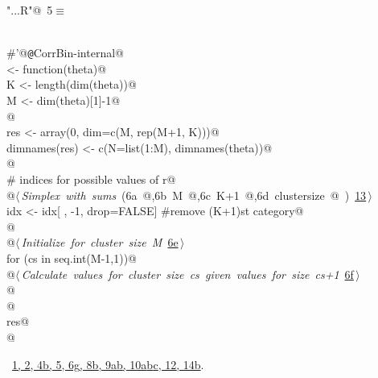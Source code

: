 \documentclass[reqno]{amsart}
\renewcommand{\NWtarget}[2]{\hypertarget{#1}{#2}}
\renewcommand{\NWlink}[2]{\hyperlink{#1}{#2}}
\begin{document}
\begin{flushleft} \small\label{scrap20}\raggedright\small
\NWtarget{nuweb5}{} \verb@"..\R\ExchMultinomial.R"@\nobreak\ {\footnotesize {5}}$\equiv$
\vspace{-1ex}
\begin{list}{}{} \item
\mbox{}\verb@@\\
\mbox{}\verb@#'@{\tt @}\verb@rdname CorrBin-internal@\\
\mbox{}\verb@Marginals <- function(theta){@\\
\mbox{}\verb@  K <- length(dim(theta))@\\
\mbox{}\verb@  M <- dim(theta)[1]-1@\\
\mbox{}\verb@  @\\
\mbox{}\verb@  res <- array(0, dim=c(M, rep(M+1, K)))@\\
\mbox{}\verb@  dimnames(res) <- c(N=list(1:M), dimnames(theta))@\\
\mbox{}\verb@  @\\
\mbox{}\verb@  # indices for possible values of r@\\
\mbox{}\verb@  @\hbox{$\langle\,${\itshape Simplex with sums}\nobreak\ ({\footnotesize 6a\label{scrap21}
 }\mbox{}\verb@idx @,{\footnotesize 6b\label{scrap22}
 }\mbox{}\verb@ M @,{\footnotesize 6c\label{scrap23}
 }\mbox{}\verb@ K+1 @,{\footnotesize 6d\label{scrap24}
 }\mbox{}\verb@ clustersize @ ) {\footnotesize \NWlink{nuweb13}{13}}$\,\rangle$}\verb@@\\
\mbox{}\verb@  idx <- idx[ , -1, drop=FALSE]  #remove (K+1)st category@\\
\mbox{}\verb@  @\\
\mbox{}\verb@  @\hbox{$\langle\,${\itshape Initialize for cluster size M}\nobreak\ {\footnotesize \NWlink{nuweb6e}{6e}}$\,\rangle$}\verb@@\\
\mbox{}\verb@  for (cs in seq.int(M-1,1)){@\\
\mbox{}\verb@    @\hbox{$\langle\,${\itshape Calculate values for cluster size cs given values for size cs+1}\nobreak\ {\footnotesize \NWlink{nuweb6f}{6f}}$\,\rangle$}\verb@@\\
\mbox{}\verb@  }@\\
\mbox{}\verb@  @\\
\mbox{}\verb@  res@\\
\mbox{}\verb@}@\\
\mbox{}\verb@@{\NWsep}
\end{list}
\vspace{-1.5ex}
\footnotesize
\begin{list}{}{\setlength{\itemsep}{-\parsep}\setlength{\itemindent}{-\leftmargin}}
\item \NWtxtFileDefBy\ \NWlink{nuweb1}{1}\NWlink{nuweb2}{, 2}\NWlink{nuweb4b}{, 4b}\NWlink{nuweb5}{, 5}\NWlink{nuweb6g}{, 6g}\NWlink{nuweb8b}{, 8b}\NWlink{nuweb9a}{, 9a}\NWlink{nuweb9b}{b}\NWlink{nuweb10a}{, 10a}\NWlink{nuweb10b}{b}\NWlink{nuweb10c}{c}\NWlink{nuweb12}{, 12}\NWlink{nuweb14b}{, 14b}.

\item{}
\end{list}
\vspace{4ex}
\end{flushleft}
\end{document}
